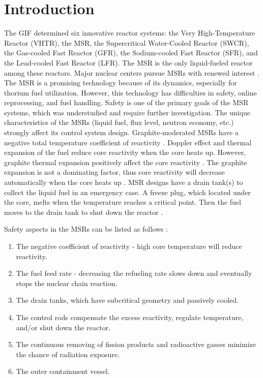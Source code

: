 \section{Introduction} \label{Introduction}

The \gls{GIF} \cite{doe2002technology} determined six innovative reactor 
systems: the Very High-Temperature Reactor (VHTR), the \gls{MSR}, the 
Supercritical Water-Cooled Reactor (SWCR), the Gas-cooled Fast Reactor (GFR), 
the Sodium-cooled Fast Reactor (SFR), and the Lead-cooled Fast Reactor (LFR). 
The MSR is the only liquid-fueled reactor among these reactors. Major nuclear 
centers pursue MSRs with renewed interest \cite{betzler_impacts_2019, 
ashraf2019whole_core,betzler2016modeling,mohsin2019safety,zhang2020radiotoxicity}.
 The MSR is a promising technology because of its dynamics, especially for 
thorium fuel utilization. However, this technology has difficulties in safety, 
online reprocessing, and fuel handling. Safety is one of the primary goals of 
the MSR systems, which was understudied and require further investigation. The 
unique characteristics of the MSRs (liquid fuel, flux level, neutron economy, 
etc.) strongly affect its control system design. Graphite-moderated MSRs have a 
negative total temperature coefficient of reactivity 
\cite{robertson_conceptual_1971,nuttin2005potential,rykhlevskii2019modeling,ashraf2019whole_core}.
 Doppler effect and thermal expansion of the fuel reduce core reactivity when 
the core heats up. However, graphite thermal expansion positively affect the 
core reactivity \cite{mathieu2006thorium}. The graphite expansion is not a 
dominating factor, thus core reactivity will decrease automatically when the 
core heats up \cite{li_optimization_2018}. MSR designs have a drain tank(s) to 
collect the liquid fuel in an emergency case. A freeze plug, which located 
under the core, melts when the temperature reaches a critical point. Then the 
fuel moves to the drain tank to shut down the reactor \cite{elsheikh2013safety}.

Safety aspects in the MSRs can be listed as follows \cite{elsheikh2013safety,merle2008optimization}:
\begin{enumerate}
\item The negative coefficient of reactivity - high core temperature will reduce reactivity.
\item The fuel feed rate - decreasing the refueling rate slows down and eventually stops the nuclear chain reaction.
\item The drain tanks, which have subcritical geometry and passively cooled.
\item The control rods compensate the excess reactivity, regulate temperature, and/or shut down the reactor.
\item The continuous removing of fission products and radioactive gasses minimize the chance of radiation exposure.
\item The outer containment vessel.
\end{enumerate}

